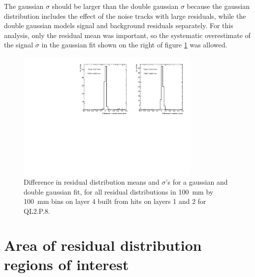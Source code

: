 The gaussian $\sigma$ should be larger than the double gaussian $\sigma$ because the gaussian distribution includes the effect of the noise tracks with large residuals, while the double gaussian models signal and background residuals separately. For this analysis, only the residual mean was important, so the systematic overestimate of the signal $\sigma$ in the gaussian fit shown on the right of figure \ref{fig:double_gaussian_compare_fits} was allowed.

\begin{figure}
    \centering
    \includegraphics[width = 0.8\textwidth]{figures/figure_compare_residual_fits_QL2P08_3100V_2021-06-18_no_dnl_minus_QL2P08_3100V_2021-07-19_doub_gaus_log_scale_layer4_fixedlayers12.pdf} 
    \caption{Difference in residual distribution means and $\sigma$'s for a gaussian and double gaussian fit, for all residual distributions in \SI{100}{\milli\meter} by \SI{100}{\milli\meter} bins on layer 4 built from hits on layers 1 and 2 for QL2.P.8.}
    \label{fig:double_gaussian_compare_fits}
\end{figure}

\section{Area of residual distribution regions of interest}
\label{appendix:systematics_bin_size}


